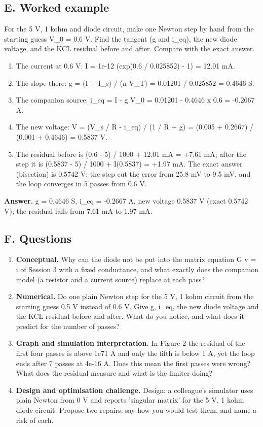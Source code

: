 \documentclass[11pt,a4paper]{article}
\begin{document}
\subsection*{E. Worked example}
For the 5 V, 1 kohm and diode circuit, make one Newton step by hand from the starting guess V\_0 = 0.6 V. Find the tangent (g and i\_eq), the new diode voltage, and the KCL residual before and after. Compare with the exact answer.
\begin{enumerate}[nosep]
\item The current at 0.6 V: I = 1e-12 (exp(0.6 / 0.025852) - 1) = 12.01 mA.
\item The slope there: g = (I + I\_s) / (n V\_T) = 0.01201 / 0.025852 = 0.4646 S.
\item The companion source: i\_eq = I - g V\_0 = 0.01201 - 0.4646 x 0.6 = -0.2667 A.
\item The new voltage: V = (V\_s / R - i\_eq) / (1 / R + g) = (0.005 + 0.2667) / (0.001 + 0.4646) = 0.5837 V.
\item The residual before is (0.6 - 5) / 1000 + 12.01 mA = +7.61 mA; after the step it is (0.5837 - 5) / 1000 + I(0.5837) = +1.97 mA. The exact answer (bisection) is 0.5742 V: the step cut the error from 25.8 mV to 9.5 mV, and the loop converges in 5 passes from 0.6 V.
\end{enumerate}
\textbf{Answer.} g = 0.4646 S, i\_eq = -0.2667 A, new voltage 0.5837 V (exact 0.5742 V); the residual falls from 7.61 mA to 1.97 mA.

\subsection*{F. Questions}
\begin{enumerate}[nosep]
\item \textbf{Conceptual.} Why can the diode not be put into the matrix equation G v = i of Session 3 with a fixed conductance, and what exactly does the companion model (a resistor and a current source) replace at each pass?
\item \textbf{Numerical.} Do one plain Newton step for the 5 V, 1 kohm circuit from the starting guess 0.5 V instead of 0.6 V. Give g, i\_eq, the new diode voltage and the KCL residual before and after. What do you notice, and what does it predict for the number of passes?
\item \textbf{Graph and simulation interpretation.} In Figure 2 the residual of the first four passes is above 1e71 A and only the fifth is below 1 A, yet the loop ends after 7 passes at 4e-16 A. Does this mean the first passes were wrong? What does the residual measure and what is the limiter doing?
\item \textbf{Design and optimisation challenge.} Design: a colleague's simulator uses plain Newton from 0 V and reports 'singular matrix' for the 5 V, 1 kohm diode circuit. Propose two repairs, say how you would test them, and name a risk of each.
\end{enumerate}
\end{document}

